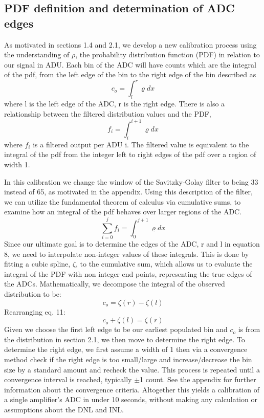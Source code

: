 \documentclass[11pt, letterpaper]{article}
\begin{document}
\subsection{PDF definition and determination of ADC edges} 	
\indent

As motivated in sections 1.4 and 2.1, we develop a new calibration process using the understanding of $\rho$, the probability distribution function (PDF) in relation to our signal in ADU. 
Each bin of the ADC will have counts which are the integral of the pdf, from the left edge of the bin to the right edge of the bin described as
 \begin{equation}\label{}
c_o =  \int_{l}^{r} \varrho dx
\end{equation}
where l is the left edge of the ADC, r is the right edge. 
There is also a relationship between the filtered distribution values and the PDF,
 \begin{equation}\label{}
f_i =  \int_{i}^{i+1} \varrho dx
\end{equation}
where $f_{i}$ is a filtered output per ADU i. 
The filtered value is equivalent to the integral of the pdf from the integer left to right edges of the pdf over a region of width 1. 
\indent 


In this calibration we change the window of the Savitzky-Golay filter to being 33 instead of 65, as motivated in the appendix. 
Using this description of the filter, we can utilize the fundamental theorem of calculus via cumulative sums, to examine how an integral of the pdf behaves over larger regions of the ADC. 
 \begin{equation}\label{}
\sum_{i=0}^{j} f_i= \int_{0}^{j+1} \varrho dx
\end{equation}
Since our ultimate goal is to determine the edges of the ADC, r and l in equation 8, we need to interpolate non-integer values of these integrals. 
This is done by fitting a cubic spline, $ \zeta$, to the cumulative sum, which allows us to evaluate the integral of the PDF with non integer end points, representing the true edges of the ADCs. 
Mathematically, we decompose the integral of the observed distribution to be:
 \begin{equation}\label{}
c_o = \zeta(r) - \zeta(l)
\end{equation}
Rearranging eq. 11: 
 \begin{equation}\label{}
c_o + \zeta(l) = \zeta(r)
\end{equation}
Given we choose the first left edge to be our earliest populated bin and $c_{o}$ is from the distribution in section 2.1, we then move to determine the right edge. 
To determine the right edge, we first assume a width of 1 then via a convergence method check if the right edge is too small/large and increase/decrease the bin size by a standard amount and recheck the value. 
This process is repeated until a convergence interval is reached, typically $\pm$1 count. 
See the appendix for further information about the convergence criteria. 
Altogether this yields a calibration of a single amplifier's ADC in under 10 seconds, without making any calculation or assumptions about the DNL and INL.
\end{document}
